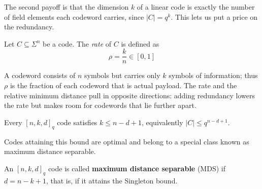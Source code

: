 \documentclass[../../book]{subfiles}
\begin{document}
The second payoff is that the dimension $k$ of a linear code is exactly the number of field elements each codeword carries, since $|C| = q^k$. This lets us put a price on the redundancy.

\begin{definition}[Rate]\label{def:rate}
  Let $C\subseteq \Sigma^n$ be a code. The \emph{rate} of $C$ is defined as 
  \begin{equation*}
    \rho = \frac{k}{n}\in [0,1]
  \end{equation*}
\end{definition}

A codeword consists of $n$ symbols but carries only $k$ symbols of information; thus $\rho$ is the fraction of each codeword that is actual payload. The rate and the relative minimum distance pull in opposite directions: adding redundancy lowers the rate but makes room for codewords that lie further apart.

\begin{proposition}\label{prop:singleton}
  Every $[n,k,d]_q$ code satisfies $k \leq n-d+1$, equivalently $|C| \leq q^{n-d+1}$.
\end{proposition}

Codes attaining this bound are optimal and belong to a special class known as maximum distance separable.

\begin{definition}\label{def:mds}
  An $[n,k,d]_q$ code is called \textbf{maximum distance separable} (MDS) if $d = n-k+1$,
  that is, if it attains the Singleton bound.
\end{definition}
\end{document}
